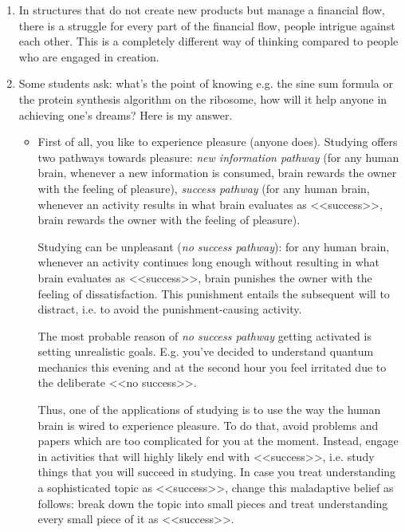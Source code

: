 \documentclass[11pt]{article}
\theoremstyle{remark}
\theoremstyle{definition}
\begin{document}
\begin{enumerate}
\item In structures that do not create new products but manage a financial flow, there is a struggle for every part of the financial flow, people intrigue against each other. This is a completely different way of thinking compared to people who are engaged in creation.





\item Some students ask: what's the point of knowing e.g. the sine sum formula or the protein synthesis algorithm on the ribosome, how will it help anyone in achieving one's dreams? Here is my answer.

\begin{itemize}

\item First of all, you like to experience pleasure (anyone does). Studying offers two pathways towards pleasure: \textit{new information pathway} (for any human brain, whenever a new information is consumed, brain rewards the owner with the feeling of pleasure), \textit{success pathway} (for any human brain, whenever an activity results in what brain evaluates as <<success>>, brain rewards the owner with the feeling of pleasure).

Studying can be unpleasant (\textit{no success pathway}): for any human brain, whenever an activity continues long enough without resulting in what brain evaluates as <<success>>, brain punishes the owner with the feeling of dissatisfaction. This punishment entails the subsequent will to distract, i.e. to avoid the punishment-causing activity.


The most probable reason of \textit{no success pathway} getting activated is setting unrealistic goals. E.g. you've decided to understand quantum mechanics this evening and at the second hour you feel irritated due to the deliberate <<no success>>.


Thus, one of the applications of studying is to use the way the human brain is wired to experience pleasure. To do that, avoid problems and papers which are too complicated for you at the moment. Instead, engage in activities that will highly likely end with <<success>>, i.e. study things that you will succeed in studying. In case you treat understanding a sophisticated topic as <<success>>, change this maladaptive belief as follows: break down the topic into small pieces and treat understanding every small piece of it as <<success>>.





\end{itemize}
\end{enumerate}
\end{document}
